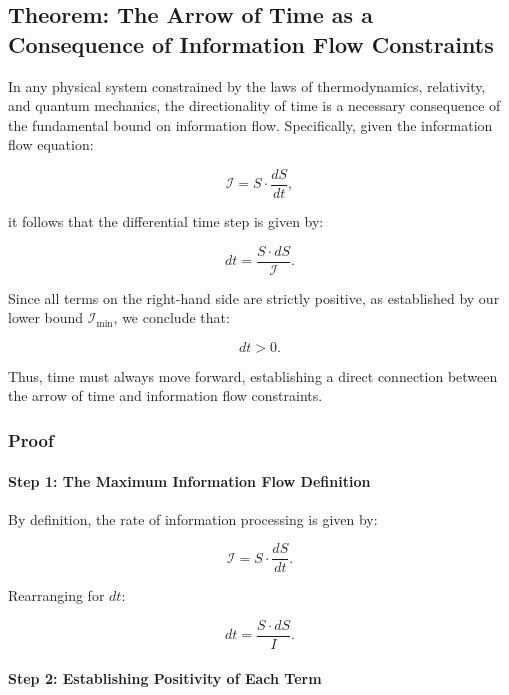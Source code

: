 \documentclass[12pt]{article}
\begin{document}
\subsection{Theorem: The Arrow of Time as a Consequence of Information Flow Constraints}

In any physical system constrained by the laws of thermodynamics, relativity, and quantum mechanics, the directionality of time is a necessary consequence of the fundamental bound on information flow. Specifically, given the information flow equation:

\begin{equation}
    \mathcal{I} = S \cdot \frac{dS}{dt},
\end{equation}

it follows that the differential time step is given by:

\begin{equation}
    dt = \frac{S \cdot dS}{\mathcal{I}}.
\end{equation}

Since all terms on the right-hand side are strictly positive, as established by our lower bound $\mathcal{I}_{\min}$, we conclude that:

\begin{equation}
    dt > 0.
\end{equation}

Thus, time must always move forward, establishing a direct connection between the arrow of time and information flow constraints.

\subsubsection{Proof}

\paragraph{Step 1: The Maximum Information Flow Definition}
By definition, the rate of information processing is given by:

\begin{equation}
    \mathcal{I} = S \cdot \frac{dS}{dt}.
\end{equation}

Rearranging for \( dt \):

\begin{equation}
    dt = \frac{S \cdot dS}{I}.
\end{equation}

\paragraph{Step 2: Establishing Positivity of Each Term}
\end{document}
